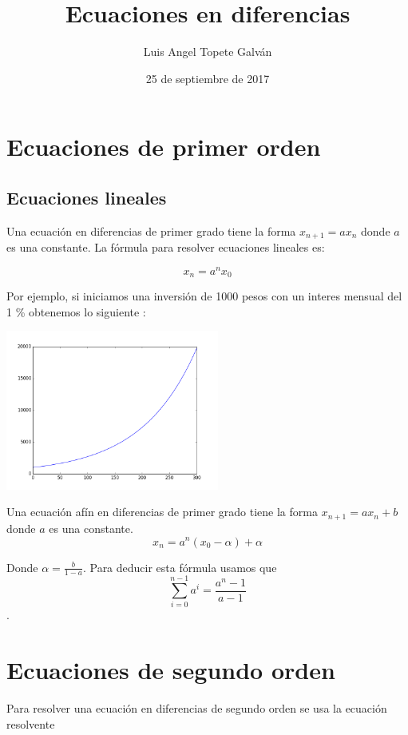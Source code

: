 \documentclass{article}
\title{Ecuaciones en diferencias}
\author{Luis Angel Topete Galván}
\date{25 de septiembre de 2017}
\begin{document}
\maketitle

\section{Ecuaciones de primer orden}

\subsection{Ecuaciones lineales}

Una ecuación en diferencias de primer grado tiene la forma $x_{n+1}=ax_n$ donde $a$ es una constante.
La fórmula para resolver ecuaciones lineales es:

\begin{equation}
  \label{eq:lineal}
  x_n=a^nx_0 
\end{equation}

Por ejemplo, si iniciamos una inversión de 1000 pesos con un interes mensual del 1 \% obtenemos lo siguiente :

\begin{center}
  \includegraphics[width=7cm]{Inversion.png}
\end{center}


Una ecuación afín en diferencias de primer grado tiene la forma $x_{n+1}=ax_n+b$ donde $a$ es una constante.
\begin{equation}
 \label{eq:afin}
 x_n=a^n(x_0-\alpha)+\alpha
\end{equation}

Donde $\alpha=\frac{b}{1-a}$.
Para deducir esta fórmula usamos que $$\sum_{i=0}^{n-1}a^i=\frac{a^n-1}{a-1}$$.
\section{Ecuaciones de segundo orden}
Para resolver una ecuación en diferencias de segundo orden se usa la ecuación resolvente
\end{document}
